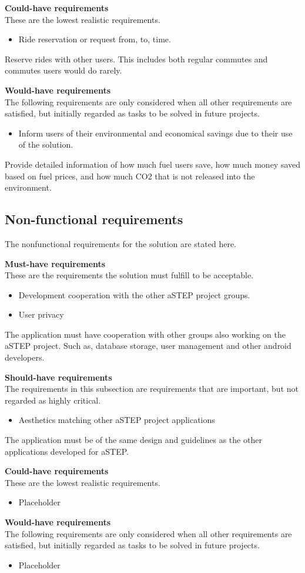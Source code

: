 \textbf{Could-have requirements}\\
These are the lowest realistic requirements. 
\begin{itemize}
	\item Ride reservation or request from, to, time.
\end{itemize}
Reserve rides with other users. This includes both regular commutes and commutes users would do rarely.

\textbf{Would-have requirements}\\
The following requirements are only considered when all other requirements are satisfied, but initially regarded as tasks to be solved in future projects.
\begin{itemize}
	\item Inform users of their environmental and economical savings due to their use of the solution.
\end{itemize}
Provide detailed information of how much fuel users save, how much money saved based on fuel prices, and how much CO2 that is not released into the environment. 

\subsection{Non-functional requirements}
The nonfunctional requirements for the solution are stated here.

\textbf{Must-have requirements}\\
These are the requirements the solution must fulfill to be acceptable.
\begin{itemize}
	\item Development cooperation with the other aSTEP project groups.
	\item User privacy
\end{itemize}
The application must have cooperation with other groups also working on the aSTEP project. Such as, database storage, user management and other android developers.

\textbf{Should-have requirements}\\
The requirements in this subsection are requirements that are important, but not regarded as highly critical.
\begin{itemize}
	\item Aesthetics matching other aSTEP project applications
\end{itemize}
The application must be of the same design and guidelines as the other applications developed for aSTEP.

\textbf{Could-have requirements}\\
These are the lowest realistic requirements. 
\begin{itemize}
	\item Placeholder
\end{itemize}

\textbf{Would-have requirements}\\
The following requirements are only considered when all other requirements are satisfied, but initially regarded as tasks to be solved in future projects.
\begin{itemize}
	\item Placeholder
\end{itemize}
